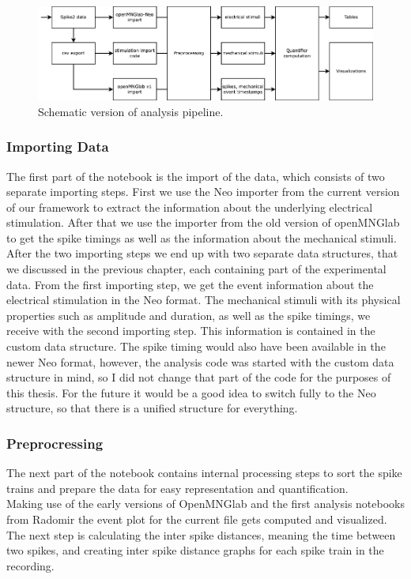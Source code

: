 \begin{figure}
	\includegraphics[width = \textwidth]{src/pic/analysis_notebook}
	\caption{Schematic version of analysis pipeline.}
	\label{fig:analysis_notebook}
\end{figure}
\subsubsection{Importing Data}
The first part of the notebook is the import of the data, which consists of two separate importing steps. 
First we use the Neo importer from the current version of our framework to extract the information about the underlying electrical stimulation. After that we use the importer from the old version of openMNGlab to get the spike timings as well as the information about the mechanical stimuli.
After the two importing steps we end up with two separate data structures, that we discussed in the previous chapter, each containing part of the experimental data. From the first importing step, we get the event information about the electrical stimulation in the Neo format. The mechanical stimuli with its physical properties such as amplitude and duration, as well as the spike timings, we receive with the second importing step. This information is contained in the custom data structure. The spike timing would also have been available in the newer Neo format, however, the analysis code was started with the custom data structure in mind, so I did not change that part of the code for the purposes of this thesis. For the future it would be a good idea to switch fully to the Neo structure, so that there is a unified structure for everything.\\
\subsubsection{Preprocressing}
The next part of the notebook contains internal processing steps to sort the spike trains and prepare the data for easy representation and quantification.\\
Making use of the early versions of OpenMNGlab and the first analysis notebooks from Radomir the event plot for the current file gets computed and visualized. The next step is calculating the inter spike distances, meaning the time between two spikes, and creating inter spike distance graphs for each spike train in the recording.\\
